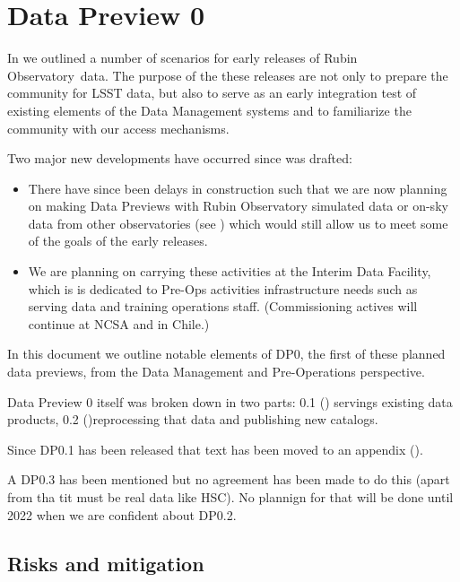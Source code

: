 \section{Data Preview 0}\label{sec:dp0}

In  we outlined a number of scenarios for early releases of Rubin Observatory~data. The purpose of the these releases are not only to prepare the community for LSST data, but also to serve as an early integration test of existing elements of the Data Management systems and to familiarize the community with our access mechanisms.

Two major new developments have occurred since  was drafted:

\begin{itemize}

\item There have since been delays in construction such that we are now planning on making Data Previews with Rubin Observatory simulated data or on-sky data from other observatories (see ) which would still allow us to meet some of the goals of the early releases.

\item We are planning on carrying these activities at the Interim Data Facility, which is is dedicated to Pre-Ops activities infrastructure needs such as serving data and training operations staff. (Commissioning actives will continue at NCSA and in Chile.)

\end{itemize}

In this document we outline notable elements of DP0, the first of these planned data previews, from the Data Management and Pre-Operations perspective.

Data Preview 0 itself was broken down in two  parts: 0.1 () servings existing data products, 0.2 ()reprocessing that data and publishing new catalogs.

Since DP0.1  has been released that text has been moved to an appendix ().

A DP0.3 has been mentioned but no agreement has been made to do this (apart from tha tit must be real data like HSC). No plannign for that will be done until 2022 when we are confident about DP0.2.



\subsection{Risks and mitigation}

